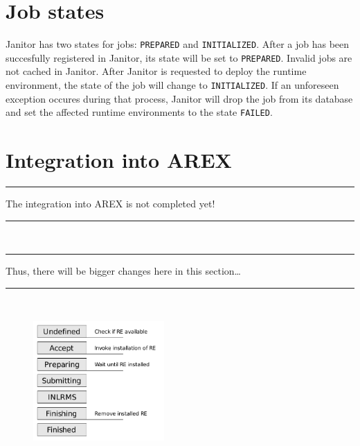 

\section{Job states}

Janitor has two states for jobs: \texttt{PREPARED} and \texttt{INITIALIZED}. After a job has been succesfully registered 
in Janitor, its state will be set to \texttt{PREPARED}. Invalid jobs are not cached in Janitor. 
After Janitor is requested to deploy the runtime environment, the state of the job will change to \texttt{INITIALIZED}. If 
an unforeseen exception occures during that process, Janitor will drop the job from its database and set the affected runtime
environments to the state \texttt{FAILED}.

\section{Integration into AREX}


\newenvironment{note}
{\rule{1ex}{1ex}\hspace{\stretch{1}}}
{\rule{1ex}{1ex}\\}
\begin{note}
The integration into AREX is not completed yet!
\end{note}
\begin{note}
Thus, there will be bigger changes here in this section\dots
\end{note}


\begin{figure}[!h]
  \begin{center}
    \includegraphics[width=5cm]{images/arex-stages.pdf}
    \mycaption{}{}
    \label{fig:RE_states}
  \end{center}
\end{figure}

